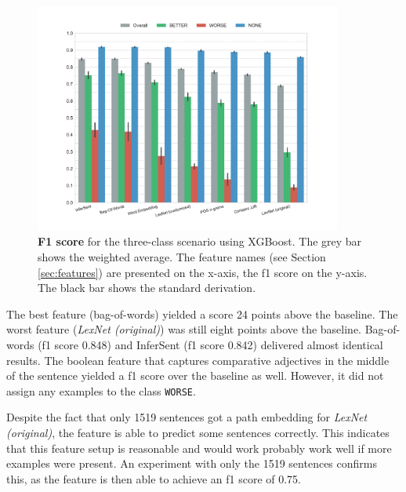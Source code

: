 \begin{figure}[htbp]
      \caption{\textbf{F1 score} for the three-class scenario using XGBoost. The grey bar shows the weighted average. The feature names (see Section \ref{sec:features}) are presented on the x-axis, the f1 score on the y-axis. The black bar shows the standard derivation.} 
    \label{fig:3_f1}
 \centering
	\includegraphics[width=0.9\textwidth]{images/experiments/f1-False}

\end{figure}


The best feature (bag-of-words) yielded a score 24 points above the baseline. The worst feature (\emph{LexNet (original)}) was still eight points above the baseline. Bag-of-words (f1 score 0.848) and InferSent (f1 score 0.842) delivered almost identical results. The boolean feature that captures comparative adjectives in the middle of the sentence yielded a f1 score over the baseline as well. However, it did not assign any examples to the class \texttt{WORSE}.

Despite the fact that only 1519 sentences got a path embedding for \emph{LexNet (original)}, the feature is able to predict some sentences correctly. This indicates that this feature setup is reasonable and would work probably work well if more examples were present. An experiment with only the 1519 sentences confirms this, as the feature is then able to achieve an f1 score of 0.75.

